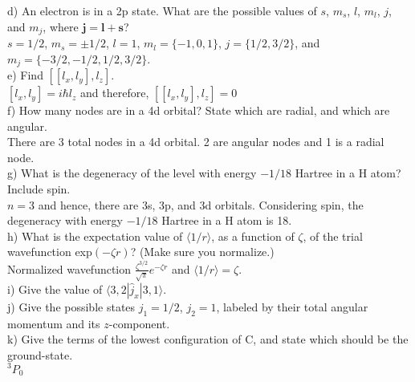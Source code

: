 \documentclass{article}
\begin{document}
\noindent d) An electron is in a 2p state. What are the possible values of $s$, $m_s$, $l$,
$m_l$, $j$, and $m_j$, where $\mathbf{j} = \mathbf{l} + \mathbf{s}$?
\\

{\color{blue} $s=1/2$, $m_s=\pm 1/2$, $l=1$, $m_l=\{-1,0,1\}$, $j=\{1/2,3/2\}$, and
  $m_j = \{-3/2,-1/2,1/2,3/2\}$.
}
\\

\noindent e) Find $[[l_x,l_y],l_z]$.
\\

{\color{blue}
  $[l_x,l_y] = i\hbar l_z$ and therefore, $[[l_x,l_y],l_z] = 0$
}
\\

\noindent f) How many nodes are in a 4d orbital? State which are radial, and which are
angular.
\\

{\color{blue} There are 3 total nodes in a 4d orbital. 2 are angular nodes and 1 is a
  radial node.
}
\\

\noindent g) What is the degeneracy of the level with energy $-1/18$ Hartree in a H
atom? Include spin.
\\

{\color{blue} $n=3$ and hence, there are 3s, 3p, and 3d orbitals. Considering spin,
  the degeneracy with energy $-1/18$ Hartree in a H atom is
  18.}
\\

\noindent h) What is the expectation value of $\langle 1/r \rangle$, as a function of
$\zeta$, of the trial wavefunction exp$(-\zeta r)$? (Make sure you normalize.)
\\

{\color{blue} Normalized wavefunction $\frac{\zeta^{3/2}}{\sqrt{\pi}}e^{-\zeta r}$
  and $\langle 1/r \rangle = \zeta$.
}
\\

\noindent i) Give the value of $\langle 3,2|\hat{j}_x|3,1\rangle$.
\\

\noindent j) Give the possible states $j_1 = 1/2$, $j_2 = 1$, labeled by their total
angular momentum and its $z$-component.
\\

\noindent k) Give the terms of the lowest configuration of C, and state which should
be the ground-state.
\\

{\color{blue} $^3P_0$}
\\
\end{document}
